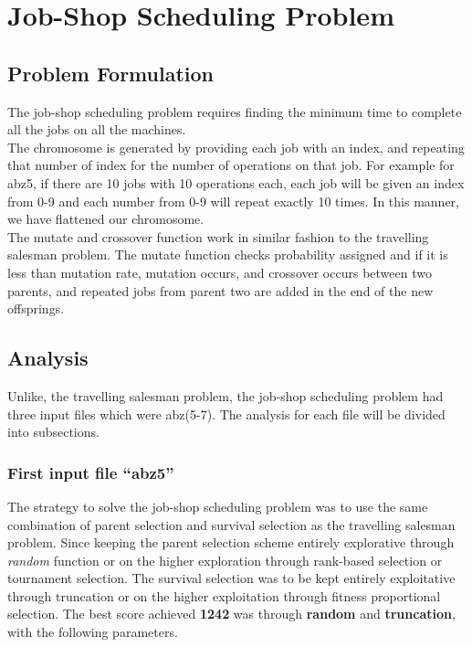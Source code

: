 \documentclass[12pt]{article}
\begin{document}
\section{Job-Shop Scheduling Problem}

\subsection{Problem Formulation}

The job-shop scheduling problem requires finding the minimum time to complete all the jobs on all the machines.
\\ \newline
The chromosome is generated by providing each job with an index, and repeating that number of index for the number of operations on that job. For example for abz5, if there are 10 jobs with 10 operations each, each job will be given an index from 0-9 and each number from 0-9 will repeat exactly 10 times. In this manner, we have flattened our chromosome. 
\\ \newline
The mutate and crossover function work in similar fashion to the travelling salesman problem. The mutate function checks probability assigned and if it is less than mutation rate, mutation occurs, and crossover occurs between two parents, and repeated jobs from parent two are added in the end of the new offsprings. 

\subsection{Analysis}

Unlike, the travelling salesman problem, the job-shop scheduling problem had three input files which were abz(5-7). The analysis for each file will be divided into subsections.

\subsubsection{First input file ``abz5''}

The strategy to solve the job-shop scheduling problem was to use the same combination of parent selection and survival selection as the travelling salesman problem. Since keeping the parent selection scheme entirely explorative through \textit{random} function or on the higher exploration through rank-based selection or tournament selection. The survival selection was to be kept entirely exploitative through truncation or on the higher exploitation through fitness proportional selection. The best score achieved \textbf{1242} was through \textbf{random} and \textbf{truncation}, with the following parameters. 
\end{document}
